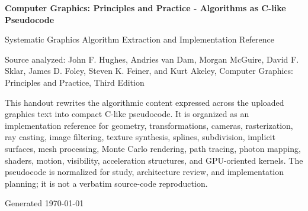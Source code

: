 \documentclass[10pt,letterpaper]{article}
\newcommand{\handouttitle}{Computer Graphics: Principles and Practice - Algorithms as C-like Pseudocode}
\begin{document}
\begin{titlepage}
\centering
\vspace*{0.70in}
{\Huge\bfseries\color{HouseBlue}\handouttitle\par}
\vspace{0.20in}
{\Large Systematic Graphics Algorithm Extraction and Implementation Reference\par}
\vspace{0.32in}
{\large Source analyzed: John F. Hughes, Andries van Dam, Morgan McGuire, David F. Sklar, James D. Foley, Steven K. Feiner, and Kurt Akeley, Computer Graphics: Principles and Practice, Third Edition\par}
\vfill
\begin{minipage}{0.88\textwidth}
\small
This handout rewrites the algorithmic content expressed across the uploaded graphics text into compact C-like pseudocode. It is organized as an implementation reference for geometry, transformations, cameras, rasterization, ray casting, image filtering, texture synthesis, splines, subdivision, implicit surfaces, mesh processing, Monte Carlo rendering, path tracing, photon mapping, shaders, motion, visibility, acceleration structures, and GPU-oriented kernels. The pseudocode is normalized for study, architecture review, and implementation planning; it is not a verbatim source-code reproduction.
\end{minipage}
\vfill
{\large Generated \today\par}
\end{titlepage}
\clearpage
{}
\tableofcontents
\clearpage
{}
\end{document}
